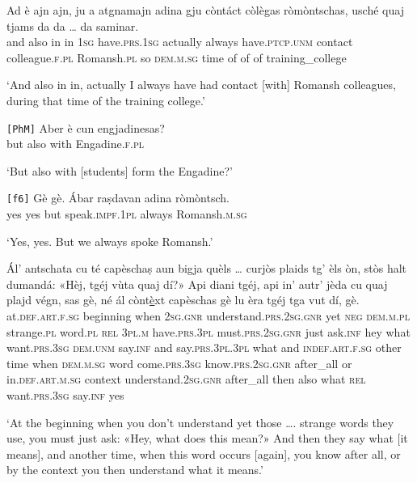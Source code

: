 \begin{linenumbers}
\gll    Ad è ajn ajn, ju a atgnamajn adina gju còntáct\footnotemark{} còlègas ròmòntschas, usché quaj tjams da da … da saminar.\\
 and also in in \textsc{1sg} have.\textsc{prs.1sg} actually always have.\textsc{ptcp.unm} contact colleague.\textsc{f.pl} Romansh.\textsc{pl} so \textsc{dem.m.sg} time of of {} of training\_college\\
\end{linenumbers}
\medskip
\glt `And also in in, actually I always have had contact [with] Romansh colleagues, during that time of the training college.'
\medskip

\begin{linenumbers}
\gll    \texttt{[PhM]} Aber è cun engjadinesas?\\
{} but also with Engadine.\textsc{f.pl}\\
\end{linenumbers}
\medskip
\glt `But also with [students] form the Engadine?'
\medskip

\begin{linenumbers}
\gll    \texttt{[f6]} Gè gè. Ábar raṣdavan adina ròmòntsch.\\
{} yes yes but speak.\textsc{impf.1pl} always Romansh.\textsc{m.sg}\\
\end{linenumbers}
\medskip
\glt `Yes, yes. But we always spoke Romansh.'
\medskip

\begin{linenumbers}
\gll    Ál’ antschata cu té capèschaṣ aun bigja quèls … curjòs plaids tg’ èls òn, stòs halt dumandá: «Hèj, tgéj vùta quaj dí?» Api diani tgéj, api in’ autr’ jèda cu quaj plajd végn, sas gè, né ál cònt\underline{è}xt capèschas gè lu èra tgéj tga vut dí, gè.\\
at.\textsc{def.art.f.sg} beginning when \textsc{2sg.gnr} understand.\textsc{prs.2sg.gnr} yet \textsc{neg} \textsc{dem.m.pl} {} strange.\textsc{pl} word.\textsc{pl} \textsc{rel} \textsc{3pl.m} have.\textsc{prs.3pl} must.\textsc{prs.2sg.gnr} just ask.\textsc{inf} hey what want.\textsc{prs.3sg} \textsc{dem.unm} say.\textsc{inf} and say.\textsc{prs.3pl.3pl} what and \textsc{indef.art.f.sg} other time when \textsc{dem.m.sg} word come.\textsc{prs.3sg} know.\textsc{prs.2sg.gnr} after\_all or in.\textsc{def.art.m.sg} context understand.\textsc{2sg.gnr} after\_all then also what \textsc{rel} want.\textsc{prs.3sg} say.\textsc{inf} yes\\
\end{linenumbers}
\medskip
\glt `At the beginning when you don’t understand yet those …. strange words they use, you must just ask: «Hey, what does this mean?» And then they say what [it means], and another time, when this word occurs [again], you know after all, or by the context you then understand what it means.'
\medskip

